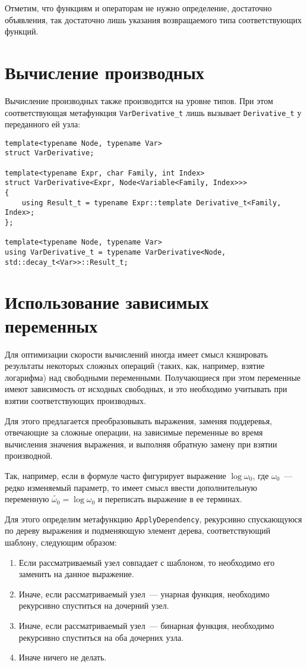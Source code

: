 \documentclass[11pt,a4paper]{article}
\begin{document}
Отметим, что функциям и операторам не нужно определение, достаточно объявления, так
достаточно лишь указания возвращаемого типа соответствующих функций.

\section{Вычисление производных}

Вычисление производных также производится на уровне типов. При этом соответствующая
метафункция \texttt{VarDerivative\_t} лишь вызывает \texttt{Derivative\_t} у
переданного ей узла:

\begin{lstlisting}
template<typename Node, typename Var>
struct VarDerivative;

template<typename Expr, char Family, int Index>
struct VarDerivative<Expr, Node<Variable<Family, Index>>>
{
	using Result_t = typename Expr::template Derivative_t<Family, Index>;
};

template<typename Node, typename Var>
using VarDerivative_t = typename VarDerivative<Node, std::decay_t<Var>>::Result_t;
\end{lstlisting}

\section{Использование зависимых переменных}

Для оптимизации скорости вычислений иногда имеет смысл кэшировать результаты
некоторых сложных операций (таких, как, например, взятие логарифма) над свободными
переменными.  Получающиеся при этом переменные имеют зависимость от исходных свободных,
и это необходимо учитывать при взятии соответствующих производных.

Для этого предлагается преобразовывать выражения, заменяя поддеревья, отвечающие за
сложные операции, на зависимые переменные во время вычисления значения выражения, и
выполняя обратную замену при взятии производной.

Так, например, если в формуле часто фигурирует выражение $\log \omega_0$, где
$\omega_0$~--- редко изменяемый параметр, то имеет смысл ввести дополнительную
переменную $\tilde{\omega_0} = \log \omega_0$ и переписать выражение в ее терминах.

Для этого определим метафункцию \texttt{ApplyDependency}, рекурсивно спускающуюся
по дереву выражения и подменяющую элемент дерева, соответствующий шаблону, следующим образом:
\begin{enumerate}
  \item Если рассматриваемый узел совпадает с шаблоном, то необходимо его заменить
	на данное выражение.
  \item Иначе, если рассматриваемый узел~--- унарная функция, необходимо рекурсивно
	спуститься на дочерний узел.
  \item Иначе, если рассматриваемый узел~--- бинарная функция, необходимо рекурсивно
	спуститься на оба дочерних узла.
  \item Иначе ничего не делать.
\end{enumerate}
\end{document}
